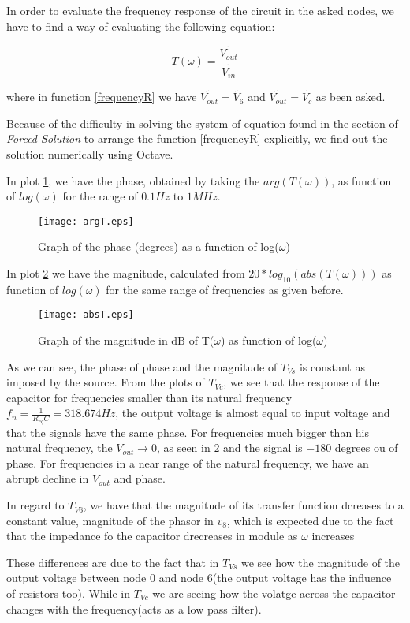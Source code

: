 In order to evaluate the frequency response of the circuit in the asked nodes, we have to find a way of evaluating the following equation:

\begin{equation}
  T(\omega) = \frac{\widetilde{V_{out}}}{\widetilde{V_{in}}}
  \label{frequencyR}
\end{equation}

where in function \ref{frequencyR} we have $\widetilde{V_{out}} = \tilde{V_6}$ and $\widetilde{V_{out}} = \tilde{V_c}$ as been asked.

Because of the difficulty in solving the system of equation found in the section of \textit{Forced Solution} to arrange the function \ref{frequencyR} explicitly, we find out the solution numerically using Octave.

In plot \ref{fig:argT}, we have the phase, obtained by taking the $arg(T(\omega))$, as function of $log(\omega)$ for the range of $0.1Hz$ to $1MHz$.

\begin{figure}[h] \centering
  \texttt{[image: argT.eps]}
  \caption{Graph of the phase (degrees) as a function of log($\omega$)}
  \label{fig:argT}
\end{figure}

In plot \ref{fig:absT} we have the magnitude, calculated from $20*log_{10}(abs(T(\omega)))$ as function of $log(\omega)$ for the same range of frequencies as given before.

\begin{figure}[h] \centering
  \texttt{[image: absT.eps]}
  \caption{Graph of the magnitude in dB of T($\omega$) as function of log($\omega$) }
  \label{fig:absT}
\end{figure}


As we can see, the phase of phase and the magnitude of $T_{Vs}$ is constant as imposed by the source.
From the plots of $T_{Vc}$, we see that the response of the capacitor for frequencies smaller than its natural frequency $f_n = \frac{1}{R_{eq}C} = 318.674 Hz$, the output voltage is almost equal to input voltage and that the signals have the same phase.
For frequencies much bigger than his natural frequency, the $V_{out} \rightarrow 0$, as seen  in \ref{fig:absT} and the signal is $-180$ degrees ou of phase.
For frequencies in a near range of the natural frequency, we have an abrupt decline in $V_{out}$ and phase.

In regard to $T_{V6}$, we have that the magnitude of its transfer function dcreases to a constant value, magnitude of the phasor in $v_8$, which is expected due to the fact that the impedance fo the capacitor drecreases in module as $\omega$ increases



These differences are due to the fact that in $T_{Vs}$ we see how the magnitude of the output voltage between node 0 and node 6(the output voltage has the influence of resistors too). While in
$T_{Vc}$ we are seeing how the volatge across the capacitor changes with the frequency(acts as a low pass filter).